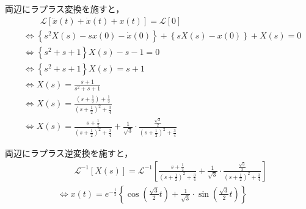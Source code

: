 \documentclass[a4paper,12pt]{article}
\begin{document}
\begin{tcolorbox}[title={7.初期値を\( \dot{x}(0)=0,x(0)=1\)とするとき、微分方程式\(\ddot{x}(t)+\dot{x}(t)+x(t)=0\)を解け。 
    }]
    \quad 両辺にラプラス変換を施すと，
    \vspace{-3mm}
    \begin{align*}
        &\qquad \mathcal{L}\left[ \ddot{x}(t)+\dot{x}(t)+x(t) \right] 
        = \mathcal{L} \left[ 0 \right] \\
        &\Leftrightarrow \left\{ s^2 X(s) - sx(0) - \dot{x}(0) \right\}
        + \left\{ sX(s) - x(0) \right\}
        + X(s) = 0  \\
        &\Leftrightarrow \left\{ s^2 + s + 1 \right\} X(s) - s - 1= 0  \\
        &\Leftrightarrow \left\{ s^2 + s + 1 \right\} X(s) = s + 1 \\
        &\Leftrightarrow X(s) = \frac{s+1}{s^2 + s + 1} \\
        &\Leftrightarrow X(s) = \frac{(s+\frac{1}{2})+\frac{1}{2}}{(s+\frac{1}{2})^2+\frac{3}{4}} \\
        &\Leftrightarrow X(s) = \frac{s+\frac{1}{2}}{(s+\frac{1}{2})^2+\frac{3}{4}} 
        +\frac{1}{\sqrt{3}} \cdot \frac{\frac{\sqrt{3}}{2}}{(s+\frac{1}{2})^2+\frac{3}{4}} 
    \end{align*}
        
    \quad 両辺にラプラス逆変換を施すと，
    \vspace{-3mm}
    \begin{align*}
    &\qquad \mathcal{L}^{-1} \left[ X(s) \right] 
    = \mathcal{L}^{-1} \left[\frac{s+\frac{1}{2}}{(s+\frac{1}{2})^2+\frac{3}{4}} 
    +\frac{1}{\sqrt{3}} \cdot \frac{\frac{\sqrt{3}}{2}}{(s+\frac{1}{2})^2+\frac{3}{4}}  \right] \\
    &\Leftrightarrow x(t) =e^{-\frac{t}{2}}\left\{\cos \left(\frac{\sqrt{3}}{2}t \right)+\frac{1}{\sqrt{3}} \cdot \sin \left( \frac{\sqrt{3}}{2}t \right) \right\}
    \end{align*}
\end{tcolorbox}
\end{document}
